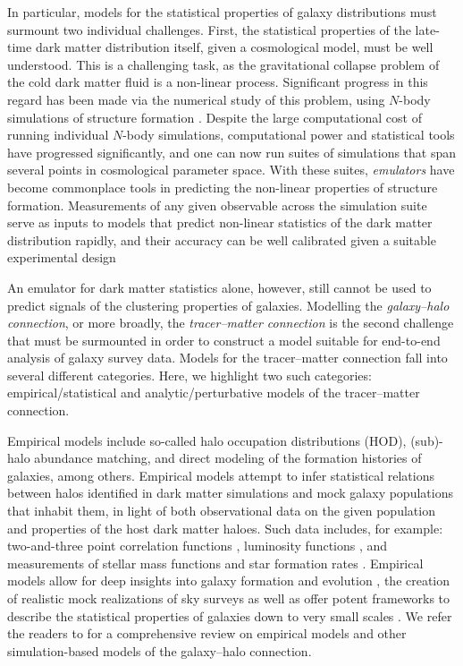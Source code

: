 \documentclass[fleqn,usenatbib]{mnras}
\begin{document}
In particular, models for the statistical properties of galaxy distributions must surmount two individual challenges. First, the statistical properties of the late-time dark matter distribution itself, given a cosmological model, must be well understood. This is a challenging task, as the gravitational collapse problem of the cold dark matter fluid is a non-linear process. Significant progress in this regard has been made via the numerical study of this problem, using $N$-body simulations of structure formation \citep{hockney1988computer, Bagla:2004au,Kuhlen:2012ft,Schneider_2016}. Despite the large computational cost of running individual $N$-body simulations, computational power and statistical tools have progressed significantly, and one can now run suites of simulations that span several points in cosmological parameter space. With these suites, \emph{emulators} have become commonplace tools in predicting the non-linear properties of structure formation. Measurements of any given observable across the simulation suite serve as inputs to models that predict non-linear statistics of the dark matter distribution rapidly, and their accuracy can be well calibrated given a suitable experimental design \citep{Heitmann_2013,Garrison_2018,DeRose:2018xdj,Knabenhans:2018cng,angulo2021bacco}\par 
An emulator for dark matter statistics alone, however, still cannot be used to predict signals of the clustering properties of galaxies. Modelling the \emph{galaxy--halo connection}, or more broadly, the \emph{tracer--matter connection} is the second challenge that must be surmounted in order to construct a model suitable for end-to-end analysis of galaxy survey data. Models for the tracer--matter connection fall into several different categories. Here, we highlight two such categories: empirical/statistical and analytic/perturbative models of the tracer--matter connection.\par 
Empirical models include so-called halo occupation distributions (HOD), (sub)-halo abundance matching, and direct modeling of the formation histories of galaxies, among others. Empirical models attempt to infer statistical relations between halos identified in dark matter simulations and mock galaxy populations that inhabit them, in light of both observational data on the given population and properties of the host dark matter haloes. Such data includes, for example: two-and-three point correlation functions \citep{Zheng:2004id, Yuan:2018qek}, luminosity functions \citep{yang2003, cooray2006}, and measurements of stellar mass functions and star formation rates \citep{Behroozi_2013}. Empirical models allow for deep insights into galaxy formation and evolution \citep{behroozi2019}, the creation of realistic mock realizations of sky surveys \citep{wechsler2021addgals} as well as offer potent frameworks to describe the statistical properties of galaxies down to very small scales \citep{derose2021modeling}. We refer the readers to \cite{Wechsler:2018pic} for a comprehensive review on empirical models and other simulation-based models of the galaxy--halo connection.\par 
\end{document}
